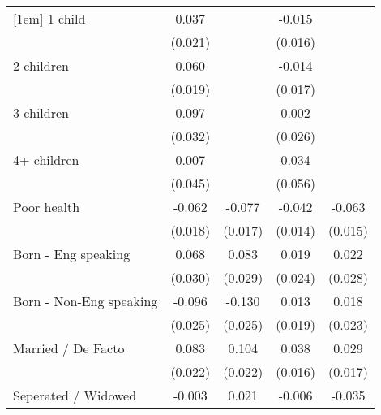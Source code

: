 {\begin{tabular}{l*{4}{c}}
[1em]
1 child             &       0.037         &                     &      -0.015         &                     \\
                    &     (0.021)         &                     &     (0.016)         &                     \\
[1em]
2 children          &       0.060\sym{**} &                     &      -0.014         &                     \\
                    &     (0.019)         &                     &     (0.017)         &                     \\
[1em]
3 children          &       0.097\sym{**} &                     &       0.002         &                     \\
                    &     (0.032)         &                     &     (0.026)         &                     \\
[1em]
4+ children         &       0.007         &                     &       0.034         &                     \\
                    &     (0.045)         &                     &     (0.056)         &                     \\
[1em]
Poor health         &      -0.062\sym{***}&      -0.077\sym{***}&      -0.042\sym{**} &      -0.063\sym{***}\\
                    &     (0.018)         &     (0.017)         &     (0.014)         &     (0.015)         \\
[1em]
Born - Eng speaking &       0.068\sym{*}  &       0.083\sym{**} &       0.019         &       0.022         \\
                    &     (0.030)         &     (0.029)         &     (0.024)         &     (0.028)         \\
[1em]
Born - Non-Eng speaking&      -0.096\sym{***}&      -0.130\sym{***}&       0.013         &       0.018         \\
                    &     (0.025)         &     (0.025)         &     (0.019)         &     (0.023)         \\
[1em]
Married / De Facto  &       0.083\sym{***}&       0.104\sym{***}&       0.038\sym{*}  &       0.029         \\
                    &     (0.022)         &     (0.022)         &     (0.016)         &     (0.017)         \\
[1em]
Seperated / Widowed &      -0.003         &       0.021         &      -0.006         &      -0.035         \\

\end{tabular}}

